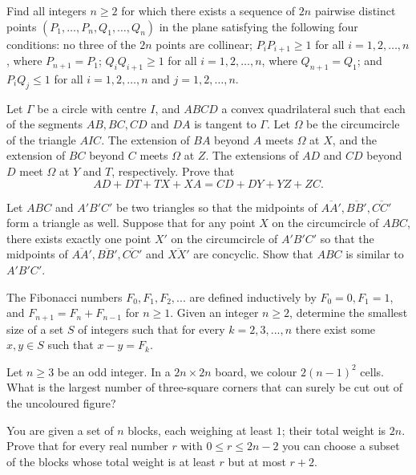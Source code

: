 \documentclass[11pt]{scrartcl}
\begin{document}
\begin{problem}[817429246000759]
Find all integers $n \geq 2$ for which there exists a sequence of $2n$ pairwise distinct points $(P_1, \dots, P_n, Q_1, \dots, Q_n)$ in the plane satisfying the following four conditions:
no three of the $2n$ points are collinear;
$P_iP_{i+1} \ge 1$ for all $i = 1, 2, \dots ,n$, where $P_{n+1}=P_1$;
$Q_iQ_{i+1} \ge 1$ for all $i = 1, 2, \dots, n$, where $Q_{n+1} = Q_1$; and
$P_iQ_j \le 1$ for all $i = 1, 2, \dots, n$ and $j = 1, 2, \dots, n$.

\end{problem}
\begin{problem}[240654526717277]
Let $\Gamma$ be a circle with centre $I$, and $A B C D$ a convex quadrilateral such that each of the segments $A B, B C, C D$ and $D A$ is tangent to $\Gamma$. Let $\Omega$ be the circumcircle of the triangle $A I C$. The extension of $B A$ beyond $A$ meets $\Omega$ at $X$, and the extension of $B C$ beyond $C$ meets $\Omega$ at $Z$. The extensions of $A D$ and $C D$ beyond $D$ meet $\Omega$ at $Y$ and $T$, respectively. Prove that\[A D+D T+T X+X A=C D+D Y+Y Z+Z C.\]
\end{problem}
\begin{problem}[915997916422887]
	Let $ABC$ and $A'B'C'$ be two triangles so that the midpoints of $\overline{AA'}, \overline{BB'}, \overline{CC'}$ form a triangle as well. Suppose that for any point $X$ on the circumcircle of $ABC$, there exists exactly one point $X'$ on the circumcircle of $A'B'C'$ so that the midpoints of $\overline{AA'}, \overline{BB'}, \overline{CC'}$ and $\overline{XX'}$ are concyclic. Show that $ABC$ is similar to $A'B'C'$.
\end{problem}
\begin{problem}[6978535805224432571]
	The Fibonacci numbers $F_0, F_1, F_2, . . .$ are defined inductively by $F_0=0, F_1=1$, and $F_{n+1}=F_n+F_{n-1}$ for $n \ge 1$. Given an integer $n \ge 2$, determine the smallest size of a set $S$ of integers such that for every $k=2, 3, . . . , n$ there exist some $x, y \in S$ such that $x-y=F_k$.
\end{problem}
\begin{problem}[6837149463099766937]
	Let $n \ge 3$ be an odd integer. In a $2n \times 2n$ board, we colour $2(n-1)^2$ cells. What is the largest number of three-square corners that can surely be cut out of the uncoloured figure?
\end{problem}
\begin{problem}[37921131297270]
	You are given a set of $n$ blocks, each weighing at least $1$; their total weight is $2n$. Prove that for every real number $r$ with $0 \leq r \leq 2n-2$ you can choose a subset of the blocks whose total weight is at least $r$ but at most $r + 2$.
\end{problem}
\end{document}
